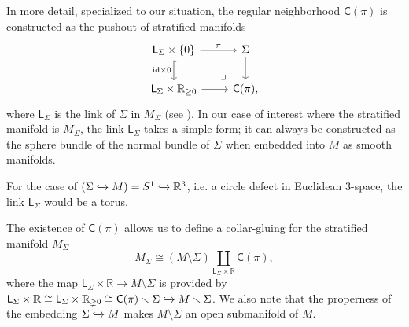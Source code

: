 \documentclass[../text]{subfiles}
\begin{document}
\begin{remark}
    In more detail, specialized to our situation, the regular neighborhood $\mathsf{C}(\pi)$ is constructed as the pushout of stratified manifolds
    \begin{equation}
        \begin{tikzcd}
            \mathsf{L}_{\Sigma} \times \{0\} \arrow[r, "\pi"] \arrow[d, "\mathrm{id} \times 0"', hook] & \Sigma \arrow[d] \\
            \mathsf{L}_{\Sigma} \times \hoint \arrow[r] & \mathsf{C}(\pi) \arrow[ul, phantom, "\lrcorner", very near start],
        \end{tikzcd}
    \end{equation}
    where $\mathsf{L}_{\Sigma}$ is the link of $\Sigma$ in $M_{\Sigma}$ (see \cite{aft_localstrut}). In our case of interest where the stratified manifold is $M_{\Sigma}$, the link $\mathsf{L}_{\Sigma}$ takes a simple form; it can always be constructed as the sphere bundle of the normal bundle of $\Sigma$ when embedded into $M$ as smooth manifolds.
\end{remark}

\begin{example}
    For the case of $(\Sigma \xhookrightarrow{} M) = {S^1 \xhookrightarrow{} \mathbb{R}^3}$, i.e. a circle defect in Euclidean 3-space, the link $\mathsf{L}_{\Sigma}$ would be a torus.
\end{example}

\begin{construction}
    The existence of $\mathsf{C}(\pi)$ allows us to define a collar-gluing for the stratified manifold $M_\Sigma$
    \begin{equation}\label{eq:M_Sigma_decomposition}
        M_\Sigma \cong \left( M \setminus \Sigma \right) \coprod_{\mathsf{L}_\Sigma \times \mathbb{R}} \mathsf{C}(\pi),
    \end{equation}
    where the map $\mathsf{L}_\Sigma \times \mathbb{R} \rightarrow M \setminus \Sigma$ is provided by $\mathsf{L}_\Sigma \times \mathbb{R} \cong \mathsf{L}_\Sigma \times \mathbb{R}_{\gneq 0} \cong \mathsf{C}(\pi) \setminus \Sigma \xhookrightarrow{} M \setminus \Sigma$. We also note that the properness of the embedding $\Sigma \xhookrightarrow{} M$ makes $M \setminus \Sigma$ an open submanifold of $M$.
\end{construction}
\end{document}

